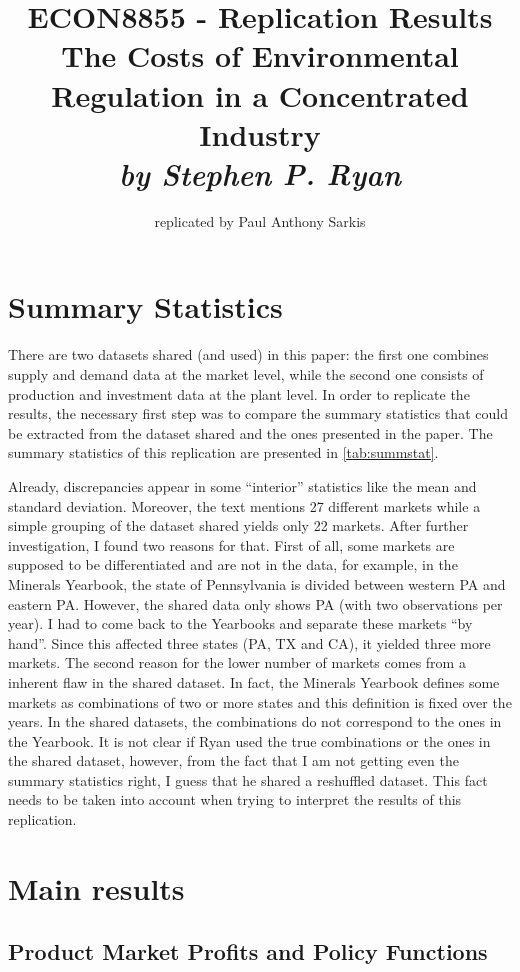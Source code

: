 \documentclass[12pt]{article}
\title{\vspace{-70pt} ECON8855 - Replication Results\\ \textbf{The Costs of Environmental Regulation in a Concentrated Industry} \\ \textit{by Stephen P. Ryan}}
\author{replicated by Paul Anthony Sarkis}
\begin{document}
\maketitle

\section{Summary Statistics}

There are two datasets shared (and used) in this paper: the first one combines supply and demand data at the market level, while the second one consists of production and investment data at the plant level. In order to replicate the results, the necessary first step was to compare the summary statistics that could be extracted from the dataset shared and the ones presented in the paper. The summary statistics of this  replication are presented in \ref{tab:summstat}.

Already, discrepancies appear in some ``interior'' statistics like the mean and standard deviation. Moreover, the text mentions 27 different markets while a simple grouping of the dataset shared yields only 22 markets. After further investigation, I found two reasons for that. First of all, some markets are supposed to be differentiated and are not in the data, for example, in the Minerals Yearbook, the state of Pennsylvania is divided between western PA and eastern PA. However, the shared data only shows PA (with two observations per year). I had to come back to the Yearbooks and separate these markets ``by hand''. Since this affected three states (PA, TX and CA), it yielded three more markets. The second reason for the lower number of markets comes from a inherent flaw in the shared dataset. In fact, the Minerals Yearbook defines some markets as combinations of two or more states and this definition is fixed over the years. In the shared datasets, the combinations do not correspond to the ones in the Yearbook. It is not clear if Ryan used the true combinations or the ones in the shared dataset, however, from the fact that I am not getting even the summary statistics right, I guess that he shared a reshuffled dataset. This fact needs to be taken into account when trying to interpret the results of this replication.

\section{Main results}

\subsection{Product Market Profits and Policy Functions}
\end{document}
